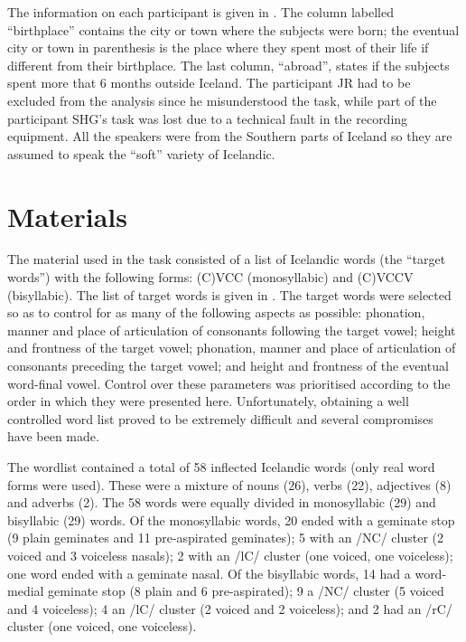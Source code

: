 \documentclass[11pt,a4paper,openany]{memoir}\usepackage[]{graphicx}\usepackage[]{color}
\begin{document}
The information on each participant is given in .
The column labelled ``birthplace'' contains the city or town where the subjects were born; the eventual city or town in parenthesis is the place where they spent most of their life if different from their birthplace.
The last column, ``abroad'', states if the subjects spent more that 6 months outside Iceland.
The participant JR had to be excluded from the analysis since he misunderstood the task, while part of the participant SHG's task was lost due to a technical fault in the recording equipment.
All the speakers were from the Southern parts of Iceland so they are assumed to speak the ``soft'' variety of Icelandic.



\section{Materials}
\label{s:materials}
The material used in the task consisted of a list of Icelandic words (the ``target words'') with the following forms: (C)VCC (monosyllabic) and (C)VCCV (bisyllabic).
The list of target words is given in .
The target words were selected so as to control for as many of the following aspects as possible: phonation, manner and place of articulation of consonants following the target vowel; height and frontness of the target vowel; phonation, manner and place of articulation of consonants preceding the target vowel; and height and frontness of the eventual word-final vowel.
Control over these parameters was prioritised according to the order in which they were presented here.
Unfortunately, obtaining a well controlled word list proved to be extremely difficult and several compromises have been made.

The wordlist contained a total of 58 inflected Icelandic words (only real word forms were used).
These were a mixture of nouns (26), verbs (22), adjectives (8) and adverbs (2).
The 58 words were equally divided in monosyllabic (29) and bisyllabic (29) words.
Of the monosyllabic words, 20 ended with a geminate stop (9 plain geminates and 11 pre-aspirated geminates); 5 with an /NC/ cluster (2 voiced and 3 voiceless nasals); 2 with an /lC/ cluster (one voiced, one voiceless); one word ended with a geminate nasal.
Of the bisyllabic words, 14 had a word-medial geminate stop (8 plain and 6 pre-aspirated); 9 a /NC/ cluster (5 voiced and 4 voiceless); 4 an /lC/ cluster (2 voiced and 2 voiceless); and 2 had an /rC/ cluster (one voiced, one voiceless).
\end{document}

